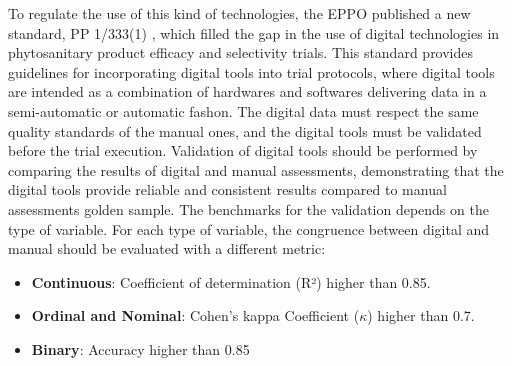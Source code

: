 \documentclass[12pt,a4paper,oneside]{report}
\begin{document}
To regulate the use of this kind of technologies, the EPPO published a new standard, 
PP 1/333(1) \cite{noauthor_span_2024}, which 
filled the gap in the use of digital technologies in phytosanitary product efficacy
and selectivity trials. This standard provides guidelines for incorporating digital
tools into trial protocols, where digital tools are intended as a combination of
hardwares and softwares delivering data 
in a semi-automatic or automatic fashon.
The digital data must respect the same quality standards of the manual
ones, and the digital tools must be validated before the trial execution.
Validation of digital tools should
be performed by comparing the results of digital and manual assessments, 
demonstrating that the digital tools provide reliable and consistent
results compared to manual assessments golden sample. 
The benchmarks for the validation depends
on the type of variable. For each type of variable, the congruence between 
digital and manual should be evaluated with a different metric:

\begin{itemize}
    \item \textbf{Continuous}: Coefficient of determination (R²) higher than 0.85.
    \item \textbf{Ordinal and Nominal}: Cohen's kappa Coefficient ($\kappa$) higher than 0.7.
    \item \textbf{Binary}: Accuracy higher than 0.85
\end{itemize}
\end{document}
